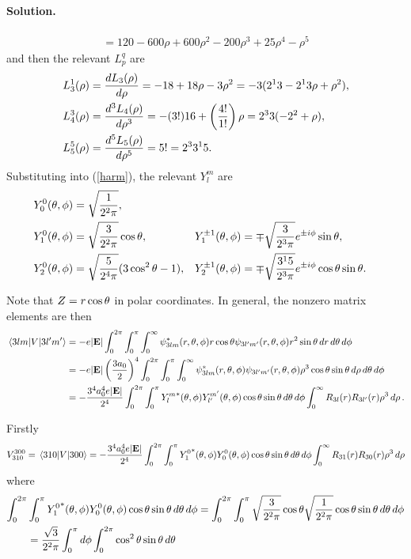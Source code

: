 \documentclass[11pt]{article}
\newcommand{\refeq}[1]{(\ref{#1})}
\newcommand{\beq}{\begin{equation*}}
\newcommand{\eeq}{\end{equation*}}
\newenvironment{solution}
{
    \paragraph{Solution.}
    \ignorespaces
}
{
}
\begin{document}
\begin{solution}
\begin{align*}
		= 120 - 600 \rho + 600 \rho^2 - 200 \rho^3 + 25 \rho^4 - \rho^5
	\end{align*}
	and then the relevant $L_p^q$ are
	\begin{align*}
		L_3^1(\rho) &= \dv{L_3(\rho)}{\rho} 
		= -18 + 18 \rho - 3 \rho^2
		= -3 (2^1 3 - 2^1 3 \rho + \rho^2), \\
		L_4^3(\rho) &= \dv[3]{L_4(\rho)}{\rho}
		= -(3!) 16 + \left( \frac{4!}{1!} \right) \rho
		= 2^3 3 (-2^2 + \rho), \\
		L_5^5(\rho) &= \dv[5]{L_5(\rho)}{\rho}
		= 5!
		= 2^3 3^1 5.
	\end{align*}
	\clearpage
	Substituting into \refeq{harm}, the relevant $Y_l^m$ are
	\begin{align*}
		Y_0^0(\theta, \phi) &= \sqrt{\frac{1}{2^2 \pi}}, \\
		Y_1^0(\theta, \phi) &= \sqrt{\frac{3}{2^2 \pi}} \cos\theta, &
		Y_1^{\pm 1}(\theta, \phi) &= \mp \sqrt{\frac{3}{2^3 \pi}} e^{\pm i \phi} \sin\theta, \\
		Y_2^0(\theta, \phi) &= \sqrt{\frac{5}{2^4 \pi}} (3 \cos^2\theta - 1), &
		Y_2^{\pm1}(\theta, \phi) &= \mp \sqrt{\frac{3^1 5}{2^3 \pi}} e^{\pm i \phi} \cos\theta \sin\theta.
	\end{align*}
	
	Note that $Z = r \cos\theta$ in polar coordinates.  In general, the nonzero matrix elements are then
	\begin{align*}
		\mel{3 l m}{V}{3 l' m'} &= -e |\mathbf{E}| \int_0^{2\pi} \int_0^\pi \int_0^\infty \psi_{3 l m}^*(r, \theta, \phi) r \cos\theta \psi_{3 l' m'}(r, \theta, \phi) r^2 \sin\theta \dd{r} \dd{\theta} \dd{\phi} \\
		&= -e |\mathbf{E}| \left( \frac{3 a_0}{2} \right)^4 \int_0^{2\pi} \int_0^\pi \int_0^\infty \psi_{3 l m}^*(r, \theta, \phi) \psi_{3 l' m'}(r, \theta, \phi) \rho^3 \cos\theta \sin\theta \dd{\rho} \dd{\theta} \dd{\phi} \\
		&= -\frac{3^4 a_0^4 e |\mathbf{E}|}{2^4} \int_0^{2\pi} \int_0^\pi {Y_l^m}^*(\theta, \phi) Y_{l'}^{m'}(\theta, \phi) \cos\theta \sin\theta \dd{\theta} \dd{\phi} \int_0^\infty R_{3 l}(r) R_{3 l'}(r) \rho^3 \dd{\rho}.
	\end{align*}
	
	Firstly
	\beq
		V_{3 1 0}^{3 0 0} = \mel{3 1 0}{V}{3 0 0}
		= -\frac{3^4 \ao^4 e |\vE|}{2^4} \int_0^{2\pi} \int_0^\pi {Y_1^0}^*(\tht, \phi) Y_0^0(\tht, \phi) \cos\tht \sin\tht \dtht \dphi \int_0^\infty R_{3 1}(r) R_{3 0}(r) \rho^3 \drho
	\eeq
	where
	\begin{align*}
		\int_0^{2\pi} &\int_0^\pi {Y_1^0}^*(\theta, \phi) Y_0^0(\theta, \phi) \cos\theta \sin\theta \dd{\theta} \dd{\phi}
		= \int_0^{2\pi} \int_0^\pi \sqrt{\frac{3}{2^2 \pi}} \cos\theta \sqrt{\frac{1}{2^2 \pi}} \cos\theta \sin\theta \dd{\theta} \dd{\phi} \\
		&= \frac{\sqrt{3}}{2^2 \pi} \int_0^\pi \dd{\phi} \int_0^{2\pi} \cos^2\theta \sin\theta \dd{\theta}
	\end{align*}
	

\end{solution}
\end{document}
